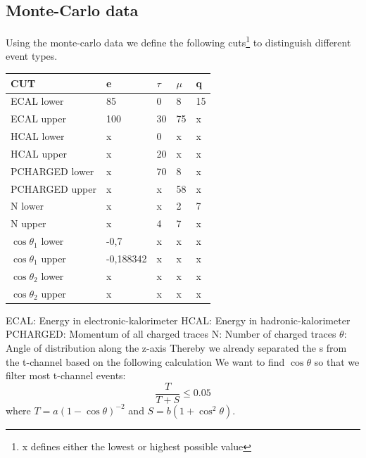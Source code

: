 \documentclass[]{article}
\begin{document}
\subsection{Monte-Carlo data}
Using the monte-carlo data we define the following cuts\footnote{x defines either the lowest or highest possible value} to distinguish different event types.
\newline
\newline
\begin{tabular}{ |p{4cm}||p{2cm}|p{2cm}|p{2cm}|p{2cm}|  }
 \hline
 CUT & e & $\tau$ & $\mu$ & q \\
 \hline
 ECAL lower & 85 & 0 & 8 & 15 \\
 ECAL upper & 100 & 30 & 75 & x \\
 HCAL lower & x & 0 & x & x \\
 HCAL upper & x & 20 & x & x \\
 PCHARGED lower & x & 70 & 8 & x \\
 PCHARGED upper & x & x & 58 & x \\
 N lower & x & x & 2 & 7 \\
 N upper & x & 4 & 7 &x \\
 $\cos\theta_1$ lower & -0,7 & x & x & x \\
 $\cos\theta_1$ upper & -0,188342 & x & x & x \\
 $\cos\theta_2$ lower & x & x & x & x \\
 $\cos\theta_2$ upper & x & x & x & x \\
 \hline
\end{tabular}
\newline
\newline
ECAL: Energy in electronic-kalorimeter
\newline
HCAL: Energy in hadronic-kalorimeter
\newline
PCHARGED: Momentum of all charged traces
\newline
N: Number of charged traces
\newline
$\theta$: Angle of distribution along the z-axis
\newline
\newline
Thereby we already separated the s from the t-channel based on the following calculation
\newline
We want to find $\cos\theta$ so that we filter most t-channel events:
\begin{equation}
\frac{T}{T+S} \leq 0.05
\label{eq:cond}
\end{equation}
where  $T=a(1-\cos{\theta})^{-2}$  and $S=b(1+\cos^2{\theta})$. 
\end{document}
